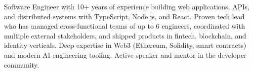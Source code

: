 
\begin{cvparagraph}
Software Engineer with 10+ years of experience building web applications, APIs, and distributed systems with TypeScript, Node.js, and React. Proven tech lead who has managed cross-functional teams of up to 6 engineers, coordinated with multiple external stakeholders, and shipped products in fintech, blockchain, and identity verticals. Deep expertise in Web3 (Ethereum, Solidity, smart contracts) and modern AI engineering tooling. Active speaker and mentor in the developer community.
\end{cvparagraph}
